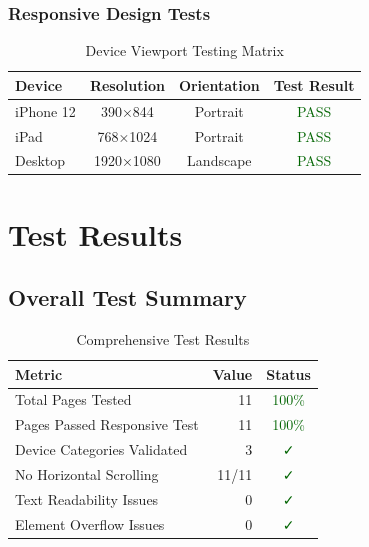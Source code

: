 \documentclass[11pt, a4paper]{report}
\begin{document}
\subsection{Responsive Design Tests}

\begin{table}[H]
    \centering
    \caption{Device Viewport Testing Matrix}
    \begin{tabular}{|l|c|c|c|}
        \hline
        \textbf{Device} & \textbf{Resolution} & \textbf{Orientation} & \textbf{Test Result} \\
        \hline
        iPhone 12 & 390×844 & Portrait & \textcolor{darkgreen}{PASS} \\
        iPad & 768×1024 & Portrait & \textcolor{darkgreen}{PASS} \\
        Desktop & 1920×1080 & Landscape & \textcolor{darkgreen}{PASS} \\
        \hline
    \end{tabular}
\end{table}

\chapter{Test Results}

\section{Overall Test Summary}

\begin{table}[H]
    \centering
    \caption{Comprehensive Test Results}
    \begin{tabular}{|l|r|c|}
        \hline
        \textbf{Metric} & \textbf{Value} & \textbf{Status} \\
        \hline
        Total Pages Tested & 11 & \textcolor{darkgreen}{100\%} \\
        Pages Passed Responsive Test & 11 & \textcolor{darkgreen}{100\%} \\
        Device Categories Validated & 3 & \textcolor{darkgreen}{✓} \\
        No Horizontal Scrolling & 11/11 & \textcolor{darkgreen}{✓} \\
        Text Readability Issues & 0 & \textcolor{darkgreen}{✓} \\
        Element Overflow Issues & 0 & \textcolor{darkgreen}{✓} \\
        \hline
    \end{tabular}
\end{table}
\end{document}
